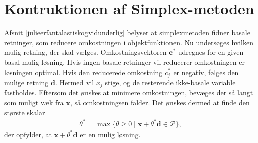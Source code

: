 {\section{Kontruktionen af Simplex-metoden}
%
Afsnit \ref{julieerfantalastiskogvidunderlig} belyser at simplexmetoden fidner basale retninger, som reducere omkostningen i objektfunktionen. Nu undersøges hvilken mulig retning, der skal vælges. 
Omkostningsvektoren $\mathbf{c}^*$ udregnes for en given basal mulig løsning. 
Hvis ingen basale retninger vil reducerer omkostningen  er løsningen optimal. 
Hvis den reducerede omkostning $c^*_j$ er negativ, følges den mulige retning $\mathbf{d}$. 
Hermed vil $x_j$ stige, og de resterende ikke-basale variable fastholdes.
Eftersom det ønskes at minimere omkostningen, bevæges der så langt som muligt væk fra $\mathbf{x}$, så omkostningsen falder.
Det ønskes dermed at finde den største skalar
\begin{align*}
\theta^* = \max \{ \theta \geq 0 \mid \textbf{x} + \theta^*\textbf{d} \in \mathcal{P} \},
\end{align*}
%
der opfylder, at $\mathbf{x} + \theta^* \mathbf{d}$ er en mulig løsning.
}
%
%
%	
%	
%	
%	
%

